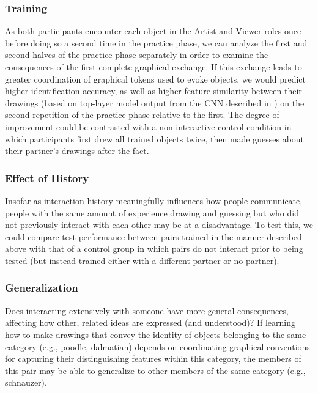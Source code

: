 \documentclass[12pt]{article}
\begin{document}
\subsubsection{Training}

As both participants encounter each object in the Artist and Viewer roles once before doing so a second time in the practice phase, we can analyze the first and second halves of the practice phase separately in order to examine the consequences of the first complete graphical exchange. If this exchange leads to greater coordination of graphical tokens used to evoke objects, we would predict higher identification accuracy, as well as higher feature similarity between their drawings (based on top-layer model output from the CNN described in ) on the second repetition of the practice phase relative to the first. The degree of improvement could be contrasted with a non-interactive control condition in which participants first drew all trained objects twice, then made guesses about their partner's drawings after the fact. 

\subsubsection{Effect of History}

Insofar as interaction history meaningfully influences how people communicate, people with the same amount of experience drawing and guessing but who did not previously interact with each other may be at a disadvantage. To test this, we could compare test performance between pairs trained in the manner described above with that of a control group in which pairs do not interact prior to being tested (but instead trained either with a different partner or no partner).

\subsubsection{Generalization}

Does interacting extensively with someone have more general consequences, affecting how other, related ideas are expressed (and understood)? If learning how to make drawings that convey the identity of objects belonging to the same category (e.g., poodle, dalmatian) depends on coordinating graphical conventions for capturing their distinguishing features within this category, the members of this pair may be able to generalize to other members of the same category (e.g., schnauzer). 
\end{document}
